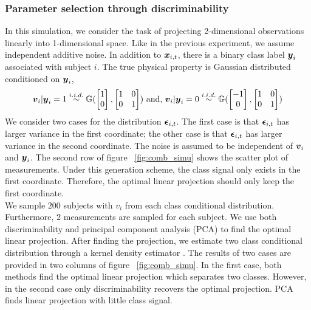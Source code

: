 \documentclass{article}
\begin{document}
\subsubsection{Parameter selection through discriminability  }
In this simulation, we consider the task of projecting 2-dimensional observations linearly into 1-dimensional space. Like in the previous experiment, we assume independent additive noise. In addition to $\boldsymbol{x}_{i,t}$, there is a binary class label $\boldsymbol{y}_{i}$ associated with subject $i$. The true physical property is Gaussian distributed conditioned on $\boldsymbol{y}_i$,
\[\boldsymbol{v}_i|\boldsymbol{y}_i=1 \overset{i.i.d.}{\sim} \mathbb{G}(\begin{bmatrix}1\\0\end{bmatrix},\begin{bmatrix}1& 0\\0& 1\end{bmatrix}) \text{ and, } \boldsymbol{v}_i|\boldsymbol{y}_i=0 \overset{i.i.d.}{\sim} \mathbb{G}(\begin{bmatrix}-1\\0\end{bmatrix},\begin{bmatrix}1& 0\\0& 1\end{bmatrix}) \]
We consider two cases for the distribution $\boldsymbol{\epsilon}_{i,t}$. The first case is that $\boldsymbol{\epsilon}_{i,t}$ has larger variance in the first coordinate; the other case is that $\boldsymbol{\epsilon}_{i,t}$ has larger variance in the second coordinate. The noise is assumed to be independent of $\boldsymbol{v}_i$ and $\boldsymbol{y}_i$. The second row of figure ~\ref{fig:comb_simu} shows the scatter plot of measurements. Under this generation scheme, the class signal only exists in the first coordinate. Therefore, the optimal linear projection should only keep the first coordinate. \\
We sample $200$ subjects with $v_i$ from each class conditional distribution. Furthermore, $2$ measurements are sampled for each subject. We use both discriminability and principal component analysis (PCA) \cite{jolliffe2002principal} to find the optimal linear projection. After finding the projection, we estimate two class conditional distribution through a kernel density estimator \cite{silverman1986density}. The results of two cases are provided in two columns of figure ~\ref{fig:comb_simu}. In the first case, both methods find the optimal linear projection which separates two classes. However, in the second case only discriminability recovers the optimal projection. PCA finds linear projection with little class signal.
\end{document}
